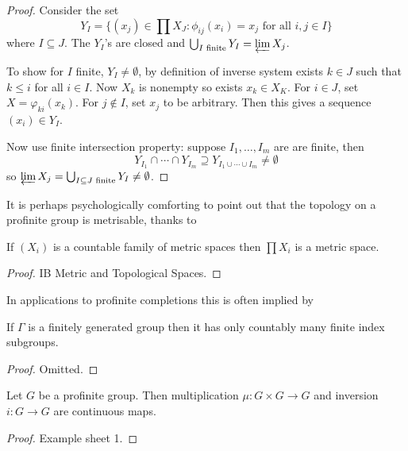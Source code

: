 \documentclass[a4paper]{article}
\begin{document}
\begin{proof}
  Consider the set
  \[
    Y_I = \{(x_j) \in \prod X_J: \phi_{ij}(x_i) = x_j \text{ for all } i, j \in I\}
  \]
  where \(I \subseteq J\). The \(Y_I\)'s are closed and \(\bigcup_{I \text{ finite}} Y_I = \varprojlim X_j\).

  To show for \(I\) finite, \(Y_I \ne \emptyset\), by definition of inverse system exists \(k \in J\)  such that \(k \leq i\) for all \(i \in I\). Now \(X_k\) is nonempty so exists \(x_k \in X_K\). For \(i \in J\), set \(X = \varphi_{ki}(x_k)\). For \(j \notin I\), set \(x_j\) to be arbitrary. Then this gives a sequence \((x_i) \in Y_I\).

  Now use finite intersection property: suppose \(I_1, \dots, I_m\) are are finite, then
  \[
    Y_{I_1} \cap \cdots \cap Y_{I_m} \supseteq Y_{I_1 \cup \cdots \cup I_m} \ne \emptyset
  \]
  so \(\varprojlim X_j = \bigcup_{I \subseteq J \text{ finite}} Y_I \ne \emptyset\).
\end{proof}

It is perhaps psychologically comforting to point out that the topology on a profinite group is metrisable, thanks to

\begin{proposition}
  If \((X_i)\) is a countable family of metric spaces then \(\prod X_i\) is a metric space.
\end{proposition}

\begin{proof}
  IB Metric and Topological Spaces.
\end{proof}

In applications to profinite completions this is often implied by

\begin{proposition}
  If \(\Gamma\) is a finitely generated group then it has only countably many finite index subgroups.
\end{proposition}

\begin{proof}
  Omitted.
\end{proof}

\begin{proposition}
  Let \(G\) be a profinite group. Then multiplication \(\mu: G \times G \to G\) and inversion \(i: G \to G\) are continuous maps.
\end{proposition}

\begin{proof}
  Example sheet 1.
\end{proof}
\end{document}
